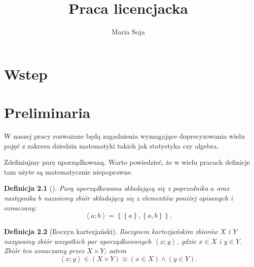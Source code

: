 \documentclass[12pt,a4paper]{report}
\author{Maria Soja}
\title{Praca licencjacka}
\newtheorem{definition}{Definicja}[chapter]
\newcommand{\parauporzadkowana}[2]{\left\langle {#1}; {#2} \right\rangle}
\newcommand{\zbior}[1]{\left\lbrace {#1} \right\rbrace }
\begin{document}
\maketitle

\chapter{Wstep}

\chapter{Preliminaria}

%

W naszej pracy rozważane będą zagadnienia wymagające doprecyzowania wielu pojęć z zakresu dziedzin matematyki takich jak statystyka czy algebra. 


Zdefiniujmy parę uporządkowaną. Warto powiedzieć, że w wielu pracach definicje tam użyte są matematycznie niepoprawne.

\begin{definition}[\citep{kuratowski1966wstkep}]
Parą uporządkowana składającą się z poprzednika $a$ oraz następnika $b$ nazwiemy zbiór składający się z elementów poniżej opisanych i oznaczany:
\begin{equation*}
\parauporzadkowana{a}{b}=\zbior{\zbior{a}, \zbior{a,b}}.
\end{equation*}

\end{definition}

\begin{definition}[Iloczyn kartezjański\citep{kuratowski1966wstkep}]
Iloczynem kartezjańskim zbiorów $X$ i $Y$ nazywamy zbiór wszystkich par uporządkowanych $\parauporzadkowana{x}{y}$, gdzie $x \in X$ i $y \in Y$. Zbiór ten oznaczamy przez $ X \times Y$; zatem
\begin{equation*}
\parauporzadkowana{x}{y} \in (X \times Y) \equiv (x \in X) \land (y \in Y).
\end{equation*} 

\end{definition}
\end{document}
